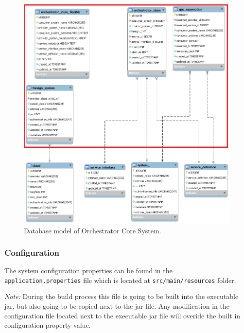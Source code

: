 \documentclass[a4paper]{arrowhead}
\begin{document}
\begin{figure}[h!]
  \centering
  \includegraphics[width=\textwidth]{figures/orchestrator_database_model}
  \caption{
    Database model of Orchestrator Core System.
  }
  \label{fig:model_overview}
\end{figure}

\clearpage

\subsubsection{Configuration}
The system configuration properties can be found in the \texttt{application.properties} file which is located at \texttt{src/main/resources} folder.

\textit{Note:} During the build process this file is going to be built into the executable jar, but also going to be copied next to the jar file. Any modification in the configuration file located next to the executable jar file will overide the built in configuration property value.
\end{document}
